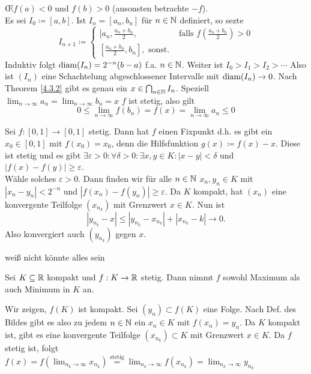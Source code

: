 \begin{subproof*}
	\OE $ f(a) < 0 $ und $ f(b) > 0 $ (ansonsten betrachte $ -f $).\\
	Es sei $ I_0 \coloneqq [a, b] $.
	Ist $ I_n = [a_n, b_n] $ für $ n \in \mathbb{N}  $ definiert, so sezte
	\[
		I_{n+1} \coloneqq \begin{cases}
			[a_n, \frac{ a_n + b_n }{ 2 } , & \text{ falls } f\left(\frac{ a_n + b_n }{ 2 }\right)  > 0 \\
			[\frac{ a_n + b_n }{ 2 } , b_n], \text{ sonst.} 
		\end{cases}
	\]
	Induktiv folgt $ \operatorname{diam}(I_n) = 2^{-n}(b - a) $ f.a. $ n \in \mathbb{N}  $. Weiter ist $ I_0 > I_1 > I_2 > \dotsb $ Also ist $ (I_n) $ eine Schachtelung abgeschlossener Intervalle mit $ \operatorname{diam}(I_n) \to 0 $. Nach Theorem \ref{4.3.2} gibt es genau ein $ x \in \bigcap_{n \in \mathbb{N} } I_n $.
	Speziell $ \lim_{n \to \infty} a_n = \lim_{n \to \infty} b_n = x $ $ f  $ ist stetig, also gilt 
	\[
		0 \leq \lim_{n \to \infty} f(b_n) = f(x) = \lim_{n \to \infty} a_n \leq  0
	\]
	
\end{subproof*}

\begin{subexample}
	Sei $ f:[0,1] \to [0, 1] $ stetig. Dann hat $ f $ einen Fixpunkt d.h. es gibt ein $ x_0 \in [0,1] $ mit $ f(x_0) = x_0 $, denn die Hilfsfunktion $ g(x) \coloneqq f(x) - x $. Diese ist stetig und es gibt $ \exists \varepsilon > 0: \forall \delta > 0 : \exists x,y \in K: | x-y| < \delta  $ und $ |f(x) - f(y)| \geq \varepsilon  $.\\
	Wähle solches $ \varepsilon > 0 $. Dann finden wir für alle $ n \in \mathbb{N}  $ $ x_n, y_n \in K $ mit $ |x_n - y_n| < 2^{-n} $ und $ |f(x_n) - f(y_n)| \geq \varepsilon  $. Da $ K $ kompakt, hat $ (x_n) $ eine konvergente Teilfolge $ (x_{n_k}) $ mit Grenzwert $ x \in K $. Nun ist
	\[
		\left| y_{n_k} - x  \right| \leq \left| y_{n_k} - x_{n_k} \right| + \left| x_{n_k} - k \right| \to 0.
	\]
	Also konvergiert auch $ (y_{n_k}) $ gegen $ x $.
\end{subexample}

\begin{subtheorem}
	weiß nicht könnte alles sein
\end{subtheorem}

\begin{subtheorem}
	Sei $ K \subseteq \mathbb{R}  $ kompakt und $ f:K\to \mathbb{R}  $ stetig. Dann nimmt $ f $ sowohl Maximum als auch Minimum in $ K $ an.
\end{subtheorem}
\begin{subproof*}
	Wir zeigen, $ f(K) $ ist kompakt. Sei $ (y_n) \subset f(K) $ eine Folge. Nach Def. des Bildes gibt es also zu jedem $ n \in \mathbb{N} $ ein $ x_n \in K $ mit $ f(x_n) = y_n $.
	Da $ K $ kompakt ist, gibt es eine konvergente Teilfolge $ (x_{n_k}) \subset K $ mit Grenzwert $ x \in K $. Da $ f $ stetig ist, folgt $ f(x) = f(\lim_{n_k \to \infty} x_{n_k}) \overset{\text{stetig} }{=} \lim_{n_k \to \infty} f(x_{n_k}) = \lim_{n_k \to \infty} y_{n_k} $
\end{subproof*}



